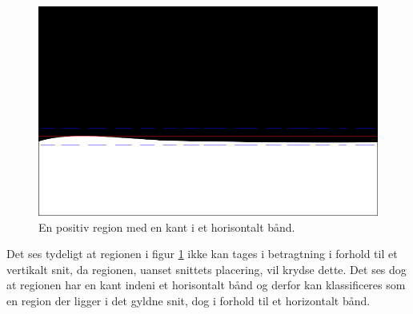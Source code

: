 {\begin{figure}[H]
    \begin{center}
        \includegraphics[scale=\imgscale,angle=0]{afsnit/vores_implementation/billeder/naiv_algoritme/naiv_horiz_positiv_blob_1}
    \end{center}
    \caption[Positiv horisontal region]{En positiv region med en
    kant i et horisontalt bånd.}
    \label{pos_horiz_naiv_margin_1}
\end{figure}
Det ses tydeligt at regionen i figur \ref{pos_horiz_naiv_margin_1} ikke
kan tages i betragtning i forhold til et vertikalt snit, da regionen,
uanset snittets placering, vil krydse dette.  Det ses dog at regionen
har en kant indeni et horisontalt bånd og derfor kan klassificeres som
en region der ligger i det gyldne snit, dog i forhold til et horizontalt
bånd.

}
